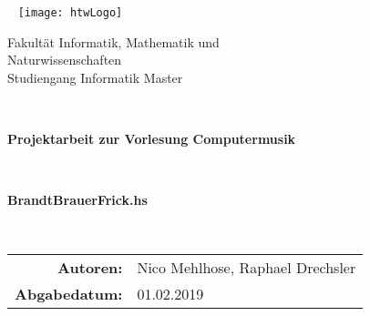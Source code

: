 \documentclass[
10pt, %
a4paper, %
oneside, %
headinclude,footinclude, %
BCOR5mm, %
]{scrartcl}
\title{\normalfont\spacedallcaps{Projektaufgabe AE}} %
\subtitle{Remove Duplicates - Spotify playlist cleaner} %
\author{\spacedlowsmallcaps{Raphael Drechsler}} %
\date{} %
\begin{document}

\renewcommand{\sectionmark}[1]{\markright{\spacedlowsmallcaps{#1}}} %
\lehead{\mbox{\llap{\small\thepage\kern1em\color{halfgray} \vline}\color{halfgray}\hspace{0.5em}\rightmark\hfil}} %

\pagestyle{scrheadings} %


{ \centering
{ \par}\
 \linebreak
\linebreak 
\linebreak
\linebreak
\linebreak
\texttt{[image: htwLogo]} 
\linebreak
\linebreak
\linebreak
\linebreak 
{\fontsize{14}{16}\selectfont \center Fakultät Informatik, Mathematik und\\Naturwissenschaften\\Studiengang Informatik Master\par}\
 \linebreak
{\fontsize{18}{20}\selectfont \center \textbf{Projektarbeit zur Vorlesung Computermusik}\par}\
{\fontsize{20}{22}\selectfont \center \textbf{BrandtBrauerFrick.hs} \par}\
\linebreak
\linebreak
\linebreak
\linebreak 
\linebreak
\linebreak 
\linebreak 
{\fontsize{14}{16}\selectfont  \begin{tabular}{rl}
 	\textbf{Autoren:} & Nico Mehlhose, Raphael Drechsler\\ 
 	\textbf{Abgabedatum:} & 01.02.2019 \\ 
 \end{tabular}
\par}
\par}
\pagebreak
\setcounter{tocdepth}{2} %
\end{document}
